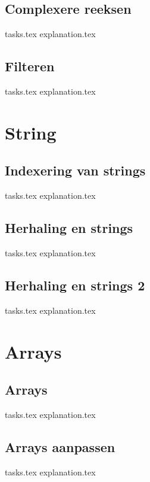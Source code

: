 \documentclass[b5paper,openright,twoside]{report}
\begin{document}
    \section{Complexere reeksen}
    {tasks.tex}       \newpage
    {explanation.tex} \newpage

    \section{Filteren}
    {tasks.tex}              \newpage
    {explanation.tex}        \newpage

    \chapter{String}
    \newpage

    \section{Indexering van strings}
    {tasks.tex}           \newpage
    {explanation.tex}     \newpage

    \section{Herhaling en strings}
    {tasks.tex}       \newpage
    {explanation.tex} \newpage

    \section{Herhaling en strings 2}
    {tasks.tex}       \newpage
    {explanation.tex} \newpage \mbox{} \newpage

    \chapter{Arrays}
    \newpage

    \section{Arrays}
    {tasks.tex}             \newpage
    {explanation.tex}       \newpage

    \section{Arrays aanpassen}
    {tasks.tex}           \newpage
    {explanation.tex}     \newpage
\end{document}
